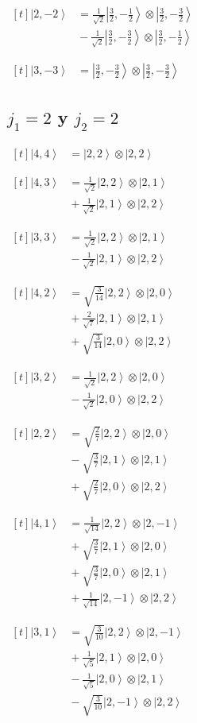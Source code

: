 \documentclass[11pt,a4paper]{article}
\newcommand{\estadocelda}[1]{%
  \begin{minipage}[t]{0.48\linewidth}
  \small\raggedright
  \(\displaystyle\begin{aligned}[t]#1\end{aligned}\)
  \end{minipage}%
}
\newcommand{\ket}[1]{\left|#1\right\rangle}
\begin{document}
\noindent\estadocelda{
\ket{2,-2} &= \frac{1}{\sqrt{2}}\ket{\frac{3}{2},-\frac{1}{2}}\otimes\ket{\frac{3}{2},-\frac{3}{2}} \\
 &{}-\frac{1}{\sqrt{2}}\ket{\frac{3}{2},-\frac{3}{2}}\otimes\ket{\frac{3}{2},-\frac{1}{2}}
}\hfill\estadocelda{
\ket{3,-3} &= \ket{\frac{3}{2},-\frac{3}{2}}\otimes\ket{\frac{3}{2},-\frac{3}{2}}
}\par\addvspace{1.4em}

\subsection{\texorpdfstring{$j_1=2$ y $j_2=2$}{j1=2 y j2=2}}

\noindent\estadocelda{
\ket{4,4} &= \ket{2,2}\otimes\ket{2,2}
}\hfill\estadocelda{
\ket{4,3} &= \frac{1}{\sqrt{2}}\ket{2,2}\otimes\ket{2,1} \\
 &{}+\frac{1}{\sqrt{2}}\ket{2,1}\otimes\ket{2,2}
}\par\addvspace{1.4em}

\noindent\estadocelda{
\ket{3,3} &= \frac{1}{\sqrt{2}}\ket{2,2}\otimes\ket{2,1} \\
 &{}-\frac{1}{\sqrt{2}}\ket{2,1}\otimes\ket{2,2}
}\hfill\estadocelda{
\ket{4,2} &= \sqrt{\frac{3}{14}}\ket{2,2}\otimes\ket{2,0} \\
 &{}+\frac{2}{\sqrt{7}}\ket{2,1}\otimes\ket{2,1} \\
 &{}+\sqrt{\frac{3}{14}}\ket{2,0}\otimes\ket{2,2}
}\par\addvspace{1.4em}

\noindent\estadocelda{
\ket{3,2} &= \frac{1}{\sqrt{2}}\ket{2,2}\otimes\ket{2,0} \\
 &{}-\frac{1}{\sqrt{2}}\ket{2,0}\otimes\ket{2,2}
}\hfill\estadocelda{
\ket{2,2} &= \sqrt{\frac{2}{7}}\ket{2,2}\otimes\ket{2,0} \\
 &{}-\sqrt{\frac{3}{7}}\ket{2,1}\otimes\ket{2,1} \\
 &{}+\sqrt{\frac{2}{7}}\ket{2,0}\otimes\ket{2,2}
}\par\addvspace{1.4em}

\noindent\estadocelda{
\ket{4,1} &= \frac{1}{\sqrt{14}}\ket{2,2}\otimes\ket{2,-1} \\
 &{}+\sqrt{\frac{3}{7}}\ket{2,1}\otimes\ket{2,0} \\
 &{}+\sqrt{\frac{3}{7}}\ket{2,0}\otimes\ket{2,1} \\
 &{}+\frac{1}{\sqrt{14}}\ket{2,-1}\otimes\ket{2,2}
}\hfill\estadocelda{
\ket{3,1} &= \sqrt{\frac{3}{10}}\ket{2,2}\otimes\ket{2,-1} \\
 &{}+\frac{1}{\sqrt{5}}\ket{2,1}\otimes\ket{2,0} \\
 &{}-\frac{1}{\sqrt{5}}\ket{2,0}\otimes\ket{2,1} \\
 &{}-\sqrt{\frac{3}{10}}\ket{2,-1}\otimes\ket{2,2}
}\par\addvspace{1.4em}
\end{document}
